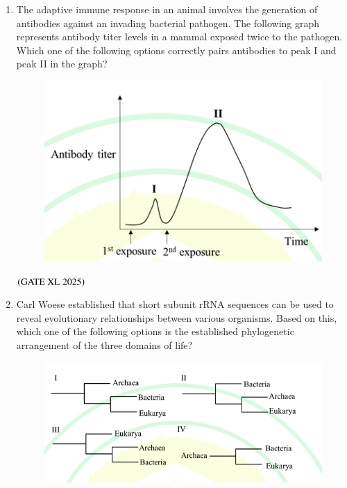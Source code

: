 \documentclass[journal]{IEEEtran}
\begin{document}
\begin{enumerate}
    \item The adaptive immune response in an animal involves the generation of antibodies against an invading bacterial pathogen. The following graph represents antibody titer levels in a mammal exposed twice to the pathogen.
    Which one of the following options correctly pairs antibodies to peak I and peak II in the graph? 

    \begin{figure}[H]
        \centering
        \includegraphics[width=0.7\columnwidth]{figs/xl2025_q74_que.png}
        \caption*{}
        \label{fig:xl2025_q74}
    \end{figure}

    \hfill $\left(\text{GATE XL 2025}\right)$

    \begin{enumerate}
    \end{enumerate}

    \item Carl Woese established that short subunit rRNA sequences can be used to reveal evolutionary relationships between various organisms. Based on this, which one of the following options is the established phylogenetic arrangement of the three domains of life?

    \begin{figure}[H]
        \centering
        \includegraphics[width=0.7\columnwidth]{figs/xl2025_q75_que.png}
        \caption*{}
        \label{fig:xl2025_q75}
    \end{figure}


\end{enumerate}
\end{document}

